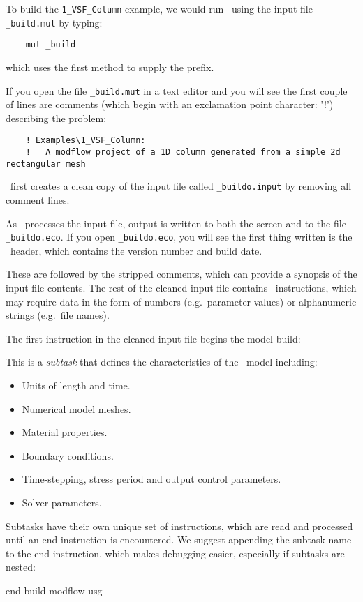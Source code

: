 To build the \texttt{1\_VSF\_Column} example, we would  run \mut\ using the input file \texttt{\_build.mut} by typing:
\begin{verbatim}
    mut _build
\end{verbatim}
which uses the first method to supply the prefix.


If you open the file \texttt{\_build.mut} in a text editor and you will see the first couple of lines are comments (which begin with an exclamation point character: '!') describing the problem:
\squish
\begin{verbatim}
    ! Examples\1_VSF_Column:
    !   A modflow project of a 1D column generated from a simple 2d rectangular mesh
\end{verbatim}
 \mut\ first creates a clean copy of the input file called \texttt{\_buildo.input} by removing all comment lines.

 As \mut\ processes the input file, output is written to both the screen and to the file \texttt{\_buildo.eco}.  If you open \texttt{\_buildo.eco}, you will see the first thing written is the \mut\ header, which contains the version number and build date.

 These are followed by the stripped comments, which  can provide a synopsis of the input file contents. The rest of the cleaned input file contains \mut\ instructions, which may require data in the form of numbers (e.g.\ parameter values) or alphanumeric strings (e.g.\ file names).


The first instruction in the cleaned input file begins the model build:

    {This  is a {\em subtask} that defines the characteristics of the \mfus\ model including:
     \begin{itemize}
        \item Units of length and time.
        \item Numerical model meshes.
        \item Material properties.
        \item Boundary conditions.
        \item Time-stepping, stress period and output control parameters.
        \item Solver parameters.
    \end{itemize}
    Subtasks have their own unique set of instructions, which are read and processed until an \textsf{end} instruction is encountered.  We suggest appending the subtask name to the \textsf{end} instruction, which makes debugging easier, especially if subtasks are nested:

    {\Large \sf end build modflow usg}
    }

